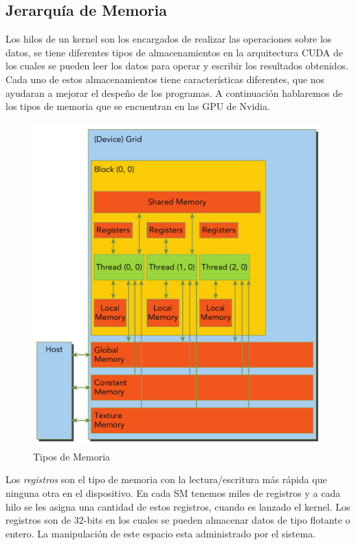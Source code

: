\subsection{Jerarquía de Memoria}


Los hilos de un kernel son los encargados de realizar las operaciones sobre los datos, se tiene diferentes tipos de almacenamientos en la arquitectura CUDA de los cuales se pueden leer los datos para operar y escribir los resultados obtenidos. Cada uno de estos almacenamientos tiene características diferentes, que nos ayudaran a mejorar el despeño de los programas. A continuación hablaremos de los tipos de memoria que se encuentran en las GPU de Nvidia.

\begin{figure}[h]
			\centering
				\includegraphics[scale=0.6]{img/memoria.jpg}
			\caption{Tipos de Memoria \cite{chengl} }
\end{figure}

Los \textit{registros} son el tipo de memoria con la lectura/escritura más rápida que ninguna otra en el dispositivo. En cada SM tenemos miles de registros y a cada hilo se les asigna una cantidad de estos registros, cuando es lanzado el kernel. Los registros son de 32-bits en los cuales se pueden almacenar datos de tipo flotante o entero. La manipulación de este espacio esta administrado por el sistema.


